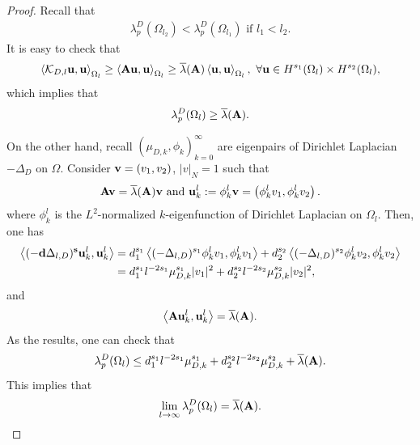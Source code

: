 \documentclass[a4paper,11pt]{amsart}
\theoremstyle{definition}
\def\O{\Omega}
\numberwithin{equation}{section}
\theoremstyle{definition}
\def\O{\Omega}
\begin{document}
\begin{proof}
Recall that  
\begin{align*}
\lambda_p^D(\O_{l_2})<\lambda_p^D(\O_{l_1}) \text{ if }l_1<l_2.
\end{align*}
It is easy to check that
\begin{align*}
\left<\mathcal{K}_{D,l}{\bf u},{\bf u}\right>_{\O_l}\geq \left<{\bf Au},{\bf u}\right>_{\O_l} \geq \overline{\lambda}({\bf A}) \left<{\bf u},{\bf u}\right>_{\O_l},~\forall {\bf u}\in H^{s_1}(\O_l)\times H^{s_2}(\O_l),
\end{align*}
which implies that
\begin{align*}
\lambda^D_p(\O_l)\geq \overline{\lambda}({\bf A}).
\end{align*}

On the other hand, recall $(\mu_{D,k},\phi_k)^\infty_{k=0}$ are eigenpairs of Dirichlet Laplacian $-\Delta_D$ on $\O$. Consider ${\bf v}=(v_1,v_2)$, $|v|_N=1$ such that 
\begin{align*}
\text{${\bf Av}=\overline{\lambda}({\bf A}){\bf v}$ and }{\bf u}_k^l:=\phi_k^l {\bf v}=\left(\phi_k^l v_1,\phi_k^l v_2\right).
\end{align*}
where $\phi_k^l$ is the $L^2$-normalized $k$-eigenfunction of Dirichlet Laplacian on $\O_{l}$. Then, one has
\begin{align*}
\left<(-\textbf{d}\Delta_{l,D})^{\textbf{s}}{\bf u}_k^l,{\bf u}_k^l \right>
&=d^{s_1}_1\left<(-\Delta_{l,D})^{s_1}\phi_k^l v_1,\phi_k^l v_1\right>+d^{s_2}_2\left<(-\Delta_{l,D})^{s_2}\phi_k^l v_2,\phi_k^l v_2\right>\\
&=d^{s_1}_1l^{-2s_1}\mu_{D,k}^{s_1}|v_1|^2+d^{s_2}_2l^{-2s_2}\mu_{D,k}^{s_2}|v_2|^2,
\end{align*}
and
\begin{align*}
\left<{\bf A}{\bf u}_k^l,{\bf u}_k^l\right>=\overline{\lambda}({\bf A}).
\end{align*}
As the results, one can check that
\begin{align*}
\lambda^D_p(\O_l)\leq d^{s_1}_1l^{-2s_1}\mu_{D,k}^{s_1}+d^{s_2}_2l^{-2s_2}\mu_{D,k}^{s_2}+\overline{\lambda}({\bf A}).
\end{align*}
This implies that
\begin{align*}
\lim_{l \rightarrow \infty}\lambda^D_p(\O_l)=\overline{\lambda}({\bf A}).
\end{align*}


\end{proof}
\end{document}
